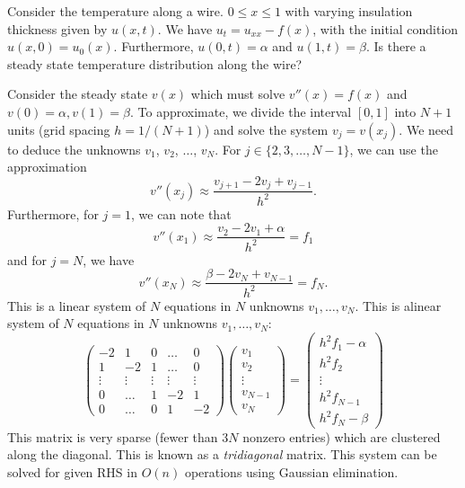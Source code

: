 \documentclass{article}
\begin{document}
\begin{example} 
    Consider the temperature along a wire. $0 \leq x \leq 1$ with varying insulation thickness given by $u(x, t)$. We have $u_t = u_{xx} - f(x)$, with the initial condition $u(x, 0) = u_0(x)$. Furthermore, $u(0, t) = \alpha$ and $u(1, t) = \beta$. Is there a steady state temperature distribution along the wire?
    \newpar

    Consider the steady state $v(x)$ which must solve $v''(x) = f(x)$ and $v(0) = \alpha, v(1) = \beta$. To approximate, we divide the interval $[0, 1]$ into $N + 1$ units (grid spacing $h = 1/(N + 1)$) and solve the system $v_j = v(x_j)$. We need to deduce the unknowns $v_1$, $v_2$, $\hdots$, $v_N$. For $j \in \{2, 3, \hdots, N - 1\}$, we can use the approximation 
        \[
            v''(x_j) \approx \frac{v_{j + 1} - 2v_j + v_{j - 1}}{h^2}.
        \]
    Furthermore, for $j = 1$, we can note that 
        \[
            v''(x_1) \approx \frac{v_2 - 2 v_1 + \alpha}{h^2} = f_1
        \]
    and for $j = N$, we have
        \[
            v''(x_N) \approx \frac{\beta - 2v_N + v_{N - 1}}{h^2} = f_N.
        \]
    This is a linear system of $N$ equations in $N$ unknowns $v_1, \hdots, v_N$. This is alinear system of $N$ equations in $N$ unknowns $v_1, \hdots, v_N$:
        \[ 
            \begin{pmatrix}
                -2 & 1 & 0 & \hdots & 0 \\
                1 & -2 & 1 & \hdots & 0 \\
                \vdots & \vdots & \vdots & \vdots & \vdots \\
                0 & \hdots & 1 & -2 & 1 \\
                0 & \hdots & 0 & 1 & -2 
            \end{pmatrix}
            \begin{pmatrix}
            v_1 \\
            v_2 \\
            \vdots \\
            v_{N - 1} \\
            v_{N}
            \end{pmatrix} = 
            \begin{pmatrix}
                h^2 f_1 - \alpha \\
                h^2 f_2 \\
                \vdots \\
                h^2 f_{N - 1} \\
                h^2 f_N - \beta
            \end{pmatrix}
        \]
    This matrix is very sparse (fewer than 3$N$ nonzero entries) which are clustered along the diagonal. This is known as a \textit{tridiagonal} matrix. This system can be solved for given RHS in $O(n)$ operations using Gaussian elimination.
\end{example}
\end{document}
